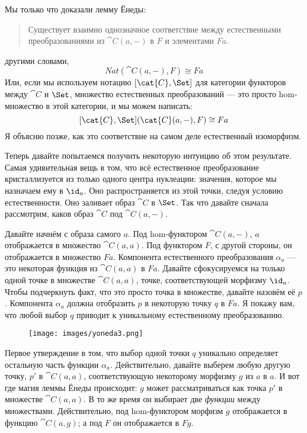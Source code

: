 Мы только что доказали лемму Ёнеды:

\begin{quote}
  Существует взаимно однозначное соответствие между естественными преобразованиями
  из $\cat{C}(a, -)$ в $F$ и элементами $F a$.
\end{quote}
другими словами,
\[\mathit{Nat}(\cat{C}(a, -), F) \cong F a\]
Или, если мы используем нотацию $[\cat{C}, \Set]$ для категории
функторов между $\cat{C}$ и $\Set$, множество естественных
преобразований --- это просто hom-множество в этой категории, и мы можем написать:
\[[\cat{C}, \Set](\cat{C}(a, -), F) \cong F a\]
Я объясню позже, как это соответствие на самом деле естественный
изоморфизм.

Теперь давайте попытаемся получить некоторую интуицию об этом результате. Самая удивительная
вещь в том, что всё естественное преобразование кристаллизуется из только
одного центра нуклеации: значения, которое мы назначаем ему в $\id_a$.
Оно распространяется из этой точки, следуя условию естественности. Оно заливает
образ $\cat{C}$ в $\Set$. Так что давайте сначала рассмотрим, каков
образ $\cat{C}$ под $\cat{C}(a, -)$.

Давайте начнём с образа самого $a$. Под hom-функтором
$\cat{C}(a, -)$, $a$ отображается в множество $\cat{C}(a, a)$.
Под функтором $F$, с другой стороны, он отображается в множество
$F a$. Компонента естественного преобразования $\alpha_a$
--- это некоторая функция из $\cat{C}(a, a)$ в $F a$. Давайте сфокусируемся на
только одной точке в множестве $\cat{C}(a, a)$, точке, соответствующей
морфизму $\id_a$. Чтобы подчеркнуть факт, что это просто точка
в множестве, давайте назовём её $p$. Компонента $\alpha_a$ должна отобразить
$p$ в некоторую точку $q$ в $F a$. Я покажу вам, что
любой выбор $q$ приводит к уникальному естественному преобразованию.

\begin{figure}[H]
  \centering
  \texttt{[image: images/yoneda3.png]}
\end{figure}

\noindent
Первое утверждение в том, что выбор одной точки $q$ уникально
определяет остальную часть функции $\alpha_a$. Действительно, давайте выберем любую
другую точку, $p'$ в $\cat{C}(a, a)$, соответствующую
некоторому морфизму $g$ из $a$ в $a$. И вот где
магия леммы Ёнеды происходит: $g$ может рассматриваться как
точка $p'$ в множестве $\cat{C}(a, a)$. В то же время
он выбирает две \emph{функции} между множествами. Действительно, под
hom-функтором морфизм $g$ отображается в функцию
$\cat{C}(a, g)$; а под $F$ он отображается в $F g$.

